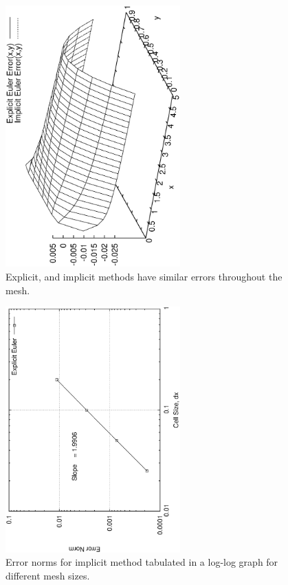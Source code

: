 \documentclass[a4paper,10pt]{article}
\begin{document}
\begin{enumerate}[I]


\begin{figure}
  \centering
  \includegraphics[width=0.6\textwidth, angle = -90]{../plots/error/error.eps}
  \caption{Explicit, and implicit methods have similar errors throughout the mesh.}                
  \label{errorprof}
\end{figure}

\begin{figure}
  \centering
  \includegraphics[width=0.6\textwidth, angle = -90]{../plots/order/eeOrder.eps}
  \caption{Error norms for implicit method tabulated in a log-log graph for different mesh sizes.}                
  \label{eeOrder}
\end{figure}



\end{enumerate}
\end{document}

